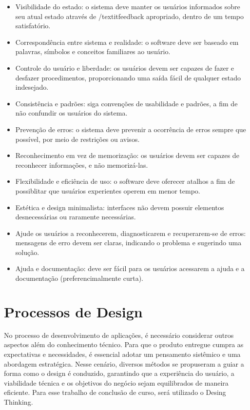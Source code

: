 \begin{itemize}
    \item Visibilidade do estado: o sistema deve manter os usuários informados sobre seu atual estado através de /textit{feedback} apropriado, dentro de um tempo satisfatório.
    \item Correspondência entre sistema e realidade: o software deve ser baseado em palavras, símbolos e conceitos familiares ao usuário.
    \item Controle do usuário e liberdade: os usuários devem ser capazes de fazer e desfazer procedimentos, proporcionando uma saída fácil de qualquer estado indesejado.
    \item Consistência e padrões: siga convenções de usabilidade e padrões, a fim de não confundir os usuários do sistema.
    \item Prevenção de erros: o sistema deve prevenir a ocorrência de erros sempre que possível, por meio de restrições ou avisos.
    \item Reconhecimento em vez de memorização: os usuários devem ser capazes de reconhecer informações, e não memorizá-las.
    \item Flexibilidade e eficiência de uso: o software deve oferecer atalhos  a fim de possiblitar que usuários experientes operem em menor tempo.
    \item Estética e design minimalista: interfaces não devem possuir elementos desnecessárias ou raramente necessárias.
    \item Ajude os usuários a reconhecerem, diagnosticarem e recuperarem-se de erros: mensagens de erro devem ser claras, indicando o problema e sugerindo uma solução.
    \item Ajuda e documentação: deve ser fácil para os usuários acessarem a ajuda e a documentação (preferencimalmente curta).
\end{itemize}

\section{Processos de Design}
No processo de desenvolvimento de aplicações, é necessário considerar outros aspectos além do conhecimento técnico. Para que o produto entregue cumpra as expectativas e necessidades, é essencial adotar um pensamento sistêmico e uma abordagem estratégica. Nesse cenário, diversos métodos se propuseram a guiar a forma como o design é conduzido, garantindo que a experiência do usuário, a viabilidade técnica e os objetivos do negócio sejam equilibrados de maneira eficiente. Para esse trabalho de conclusão de curso, será utilizado o Desing Thinking.

